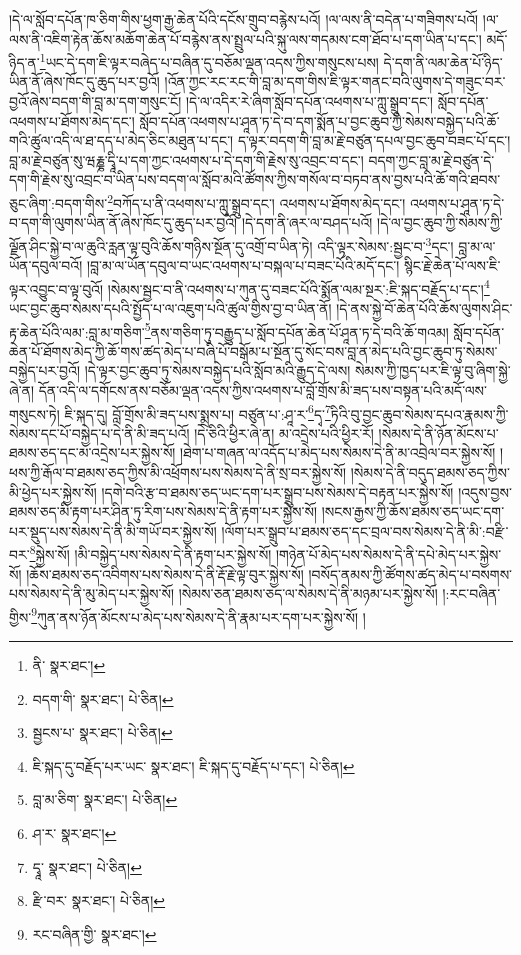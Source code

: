 །དེ་ལ་སློབ་དཔོན་ཁ་ཅིག་གིས་ཕྱག་རྒྱ་ཆེན་པོའི་དངོས་གྲུབ་བརྙེས་པའོ། །ལ་ལས་ནི་བདེན་པ་གཟིགས་པའོ། །ལ་ལས་ནི་འཇིག་རྟེན་ཆོས་མཆོག་ཆེན་པོ་བརྙེས་ནས་སྤྲུལ་པའི་སྐུ་ལས་གདམས་ངག་ཐོབ་པ་དག་ཡིན་པ་དང་། མདོ་ཉིད་ན་\footnote{ནི་  སྣར་ཐང་། }ཡང་དེ་དག་ཇི་ལྟར་བཞེད་པ་བཞིན་དུ་བཅོམ་ལྡན་འདས་ཀྱིས་གསུངས་པས། དེ་དག་ནི་ལམ་ཆེན་པོ་ཉིད་ཡིན་ནོ་ཞེས་ཁོང་དུ་ཆུད་པར་བྱའོ། །འོན་ཀྱང་རང་རང་གི་བླ་མ་དག་གིས་ཇི་ལྟར་གནང་བའི་ལུགས་དེ་གཟུང་བར་བྱའོ་ཞེས་བདག་གི་བླ་མ་དག་གསུང་ངོ། །དེ་ལ་འདིར་རེ་ཞིག་སློབ་དཔོན་འཕགས་པ་ཀླུ་སྒྲུབ་དང་། སློབ་དཔོན་འཕགས་པ་ཐོགས་མེད་དང་། སློབ་དཔོན་འཕགས་པ་ཤཱན་ཏ་དེ་བ་དག་སྨོན་པ་བྱང་ཆུབ་ཀྱི་སེམས་བསྐྱེད་པའི་ཆོ་གའི་ཚུལ་འདི་ལ་ཐ་དད་པ་མེད་ཅིང་མཐུན་པ་དང་། ད་ལྟར་བདག་གི་བླ་མ་རྗེ་བཙུན་དཔལ་བྱང་ཆུབ་བཟང་པོ་དང་། བླ་མ་རྗེ་བཙུན་སུ་ཝརྞྞ་དྭཱི་པ་དག་ཀྱང་འཕགས་པ་དེ་དག་གི་རྗེས་སུ་འབྲང་བ་དང་། བདག་ཀྱང་བླ་མ་རྗེ་བཙུན་དེ་དག་གི་རྗེས་སུ་འབྲང་བ་ཡིན་པས་བདག་ལ་སློབ་མའི་ཚོགས་ཀྱིས་གསོལ་བ་བཏབ་ནས་བྱས་པའི་ཆོ་གའི་ཐབས་ཅུང་ཞིག་:བདག་གིས་\footnote{བདག་གི་  སྣར་ཐང་།  པེ་ཅིན། }བཀོད་པ་ནི་འཕགས་པ་ཀླུ་སྒྲུབ་དང་། འཕགས་པ་ཐོགས་མེད་དང་། འཕགས་པ་ཤཱན་ཏ་དེ་བ་དག་གི་ལུགས་ཡིན་ནོ་ཞེས་ཁོང་དུ་ཆུད་པར་བྱའོ། །དེ་དག་ནི་ཞར་ལ་བཤད་པའོ། །དེ་ལ་བྱང་ཆུབ་ཀྱི་སེམས་ཀྱི་ལྗོན་ཤིང་སྐྱེ་བ་ལ་ཆུའི་རླན་ལྟ་བུའི་ཆོས་གཉིས་སྔོན་དུ་འགྲོ་བ་ཡིན་ཏེ། འདི་ལྟར་སེམས་:སྦྱང་བ་\footnote{སྦྱངས་པ་  སྣར་ཐང་།  པེ་ཅིན། }དང་། བླ་མ་ལ་ཡོན་དབུལ་བའོ། །བླ་མ་ལ་ཡོན་དབུལ་བ་ཡང་འཕགས་པ་བསྐལ་པ་བཟང་པོའི་མདོ་དང་། སྙིང་རྗེ་ཆེན་པོ་ལས་ཇི་ལྟར་འབྱུང་བ་ལྟ་བུའོ། །སེམས་སྦྱང་བ་ནི་འཕགས་པ་ཀུན་དུ་བཟང་པོའི་སྨོན་ལམ་སྔར་:ཇི་སྐད་བརྗོད་པ་དང་།\footnote{ཇི་སྐད་དུ་བརྗོད་པར་ཡང་  སྣར་ཐང་། ཇི་སྐད་དུ་བརྗོད་པ་དང་།  པེ་ཅིན། } ཡང་བྱང་ཆུབ་སེམས་དཔའི་སྤྱོད་པ་ལ་འཇུག་པའི་ཚུལ་གྱིས་བྱ་བ་ཡིན་ནོ། །དེ་ནས་སྐྱེ་བོ་ཆེན་པོའི་ཆོས་ལུགས་ཤིང་རྟ་ཆེན་པོའི་ལམ་:བླ་མ་གཅིག་\footnote{བླ་མ་ཅིག་  སྣར་ཐང་།  པེ་ཅིན། }ནས་གཅིག་ཏུ་བརྒྱུད་པ་སློབ་དཔོན་ཆེན་པོ་ཤཱན་ཏ་དེ་བའི་ཆོ་གའམ། སློབ་དཔོན་ཆེན་པོ་ཐོགས་མེད་ཀྱི་ཆོ་གས་ཚད་མེད་པ་བཞི་པོ་བསྒོམ་པ་སྔོན་དུ་སོང་བས་བླ་ན་མེད་པའི་བྱང་ཆུབ་ཏུ་སེམས་བསྐྱེད་པར་བྱའོ། །དེ་ལྟར་བྱང་ཆུབ་ཏུ་སེམས་བསྐྱེད་པའི་སློབ་མའི་རྒྱུད་དེ་ལས། སེམས་ཀྱི་ཁྱད་པར་ཇི་ལྟ་བུ་ཞིག་སྐྱེ་ཞེ་ན། དོན་འདི་ལ་དགོངས་ནས་བཅོམ་ལྡན་འདས་ཀྱིས་འཕགས་པ་བློ་གྲོས་མི་ཟད་པས་བསྟན་པའི་མདོ་ལས་གསུངས་ཏེ། ཇི་སྐད་དུ། བློ་གྲོས་མི་ཟད་པས་སྨྲས་པ། བཙུན་པ་:ཤཱ་ར་\footnote{ཤ་ར་  སྣར་ཐང་། }དྭ་\footnote{དྭཱ་  སྣར་ཐང་།  པེ་ཅིན། }ཏིའི་བུ་བྱང་ཆུབ་སེམས་དཔའ་རྣམས་ཀྱི་སེམས་དང་པོ་བསྐྱེད་པ་དེ་ནི་མི་ཟད་པའོ། །དེ་ཅིའི་ཕྱིར་ཞེ་ན། མ་འདྲེས་པའི་ཕྱིར་རོ། །སེམས་དེ་ནི་ཉོན་མོངས་པ་ཐམས་ཅད་དང་མ་འདྲེས་པར་སྐྱེས་སོ། །ཐེག་པ་གཞན་ལ་འདོད་པ་མེད་པས་སེམས་དེ་ནི་མ་འབྲེལ་བར་སྐྱེས་སོ། །ཕས་ཀྱི་རྒོལ་བ་ཐམས་ཅད་ཀྱིས་མི་འཕྲོགས་པས་སེམས་དེ་ནི་སྲ་བར་སྐྱེས་སོ། །སེམས་དེ་ནི་བདུད་ཐམས་ཅད་ཀྱིས་མི་ཕྱེད་པར་སྐྱེས་སོ། །དགེ་བའི་རྩ་བ་ཐམས་ཅད་ཡང་དག་པར་སྒྲུབ་པས་སེམས་དེ་བརྟན་པར་སྐྱེས་སོ། །འདུས་བྱས་ཐམས་ཅད་མི་རྟག་པར་ཤིན་ཏུ་རིག་པས་སེམས་དེ་ནི་རྟག་པར་སྐྱེས་སོ། །སངས་རྒྱས་ཀྱི་ཆོས་ཐམས་ཅད་ཡང་དག་པར་སྡུད་པས་སེམས་དེ་ནི་མི་གཡོ་བར་སྐྱེས་སོ། །ལོག་པར་སྒྲུབ་པ་ཐམས་ཅད་དང་བྲལ་བས་སེམས་དེ་ནི་མི་:བརྫི་བར་\footnote{རྫི་བར་  སྣར་ཐང་།  པེ་ཅིན། }སྐྱེས་སོ། །མི་བསྐྱེད་པས་སེམས་དེ་ནི་རྟག་པར་སྐྱེས་སོ། །གཉེན་པོ་མེད་པས་སེམས་དེ་ནི་དཔེ་མེད་པར་སྐྱེས་སོ། །ཆོས་ཐམས་ཅད་འབིགས་པས་སེམས་དེ་ནི་རྡོ་རྗེ་ལྟ་བུར་སྐྱེས་སོ། །བསོད་ནམས་ཀྱི་ཚོགས་ཚད་མེད་པ་བསགས་པས་སེམས་དེ་ནི་མུ་མེད་པར་སྐྱེས་སོ། །སེམས་ཅན་ཐམས་ཅད་ལ་སེམས་དེ་ནི་མཉམ་པར་སྐྱེས་སོ། །:རང་བཞིན་གྱིས་\footnote{རང་བཞིན་གྱི་  སྣར་ཐང་། }ཀུན་ནས་ཉོན་མོངས་པ་མེད་པས་སེམས་དེ་ནི་རྣམ་པར་དག་པར་སྐྱེས་སོ། །
